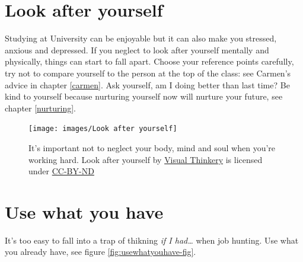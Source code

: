 \documentclass[
]{book}
\begin{document}
\hypertarget{onlyhuman}{%
\section{Look after yourself}\label{onlyhuman}}

Studying at University can be enjoyable but it can also make you stressed, anxious and depressed. If you neglect to look after yourself mentally and physically, things can start to fall apart. Choose your reference points carefully, try not to compare yourself to the person at the top of the class: see Carmen's advice in chapter \ref{carmen}. Ask yourself, am I doing better than last time? Be kind to yourself because nurturing yourself now will nurture your future, see chapter \ref{nurturing}.

\begin{figure}

{\centering \texttt{[image: images/Look after yourself]} 

}

\caption{It's important not to neglect your body, mind and soul when you're working hard. Look after yourself by \href{https://visualthinkery.com}{Visual Thinkery} is licensed under \href{https://creativecommons.org/licenses/by-nd/4.0/}{CC-BY-ND}}\label{fig:lookafter-again-fig}
\end{figure}



\hypertarget{gregwilson}{%
\section{Use what you have}\label{gregwilson}}

It's too easy to fall into a trap of thikning \emph{if I had\ldots{}} when job hunting. Use what you already have, see figure \ref{fig:usewhatyouhave-fig}.
\end{document}
